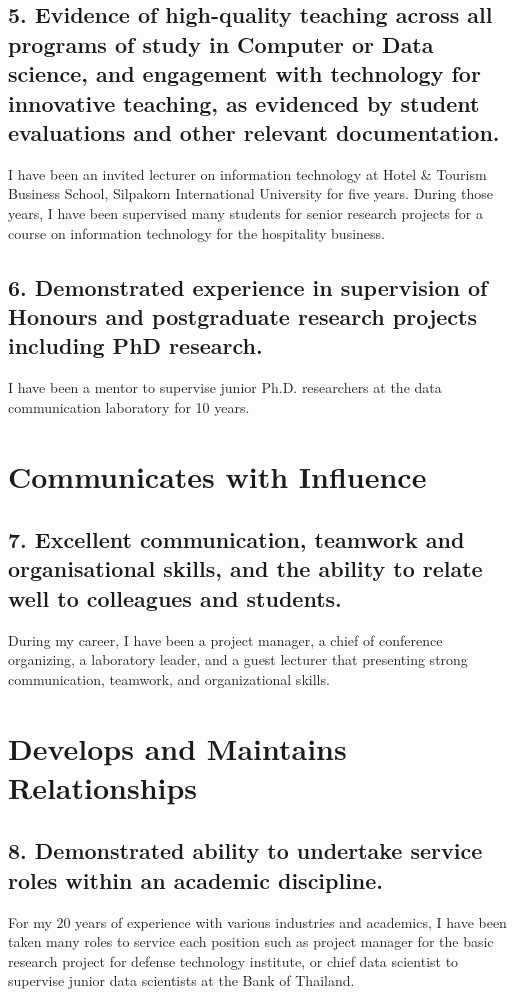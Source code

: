 \documentclass[12pt]{article}
\begin{document}
\subsection*{5. Evidence of high-quality teaching across all programs of study in Computer or Data science, and engagement with technology for innovative teaching, as evidenced by student evaluations and other relevant documentation.}

{\bfseries }I have been an invited lecturer on information technology at Hotel \& Tourism Business School, Silpakorn International University for five years. During those years, I have been supervised many students for senior research projects for a course on information technology for the hospitality business.



\subsection*{6. Demonstrated experience in supervision of Honours and postgraduate research projects including PhD research.}

{\bfseries }I have been a mentor to supervise junior Ph.D. researchers at the data communication laboratory for 10 years. 


\section*{Communicates with Influence}
\subsection*{7. Excellent communication, teamwork and organisational skills, and the ability to relate well to colleagues and students.}

{\bfseries}During my career, I have been a project manager, a chief of conference organizing,  a laboratory leader, and a guest lecturer that presenting strong communication, teamwork, and organizational skills.

\section*{Develops and Maintains Relationships}

\subsection*{8. Demonstrated ability to undertake service roles within an academic discipline.}
{\bfseries} For my 20 years of experience with various industries and academics, I have been taken many roles to service each position such as project manager for the basic research project for defense technology institute, or chief data scientist to supervise junior data scientists at the Bank of Thailand.
\end{document}
